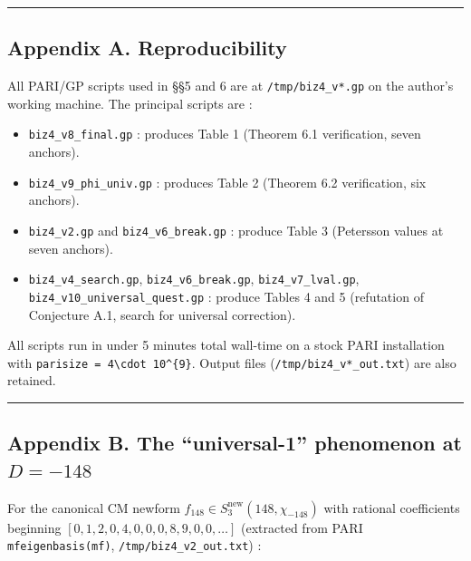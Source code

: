 \documentclass[
  11pt,
  a4paper,
]{amsart}
\providecommand{\tightlist}{\setlength{\itemsep}{0pt}\setlength{\parskip}{0pt}}
\providecommand{\tightlist}{%
  \setlength{\itemsep}{0pt}\setlength{\parskip}{0pt}}
\begin{document}
\begin{center}\rule{0.5\linewidth}{0.5pt}\end{center}

\hypertarget{appendix-a.-reproducibility}{%
\subsection{Appendix A. Reproducibility}\label{appendix-a.-reproducibility}}

All PARI/GP scripts used in §§5 and 6 are at \texttt{/tmp/biz4\_v*.gp} on the author's working machine. The principal scripts are :

\begin{itemize}
\tightlist
\item
  \texttt{biz4\_v8\_final.gp} : produces Table 1 (Theorem 6.1 verification, seven anchors).
\item
  \texttt{biz4\_v9\_phi\_univ.gp} : produces Table 2 (Theorem 6.2 verification, six anchors).
\item
  \texttt{biz4\_v2.gp} and \texttt{biz4\_v6\_break.gp} : produce Table 3 (Petersson values at seven anchors).
\item
  \texttt{biz4\_v4\_search.gp}, \texttt{biz4\_v6\_break.gp}, \texttt{biz4\_v7\_lval.gp}, \texttt{biz4\_v10\_universal\_quest.gp} : produce Tables 4 and 5 (refutation of Conjecture A.1, search for universal correction).
\end{itemize}

All scripts run in under 5 minutes total wall-time on a stock PARI installation with \texttt{parisize\ =\ 4\textbackslash{}cdot\ 10\^{}\{9\}}. Output files (\texttt{/tmp/biz4\_v*\_out.txt}) are also retained.

\begin{center}\rule{0.5\linewidth}{0.5pt}\end{center}

\hypertarget{appendix-b.-the-universal-1-phenomenon-at-d--148}{%
\subsection{\texorpdfstring{Appendix B. The ``universal-1'' phenomenon at \(D = -148\)}{Appendix B. The ``universal-1'' phenomenon at D = -148}}\label{appendix-b.-the-universal-1-phenomenon-at-d--148}}

For the canonical CM newform \(f_{148} \in S_3^{\mathrm{new}}(148, \chi_{-148})\) with rational coefficients beginning \([0, 1, 2, 0, 4, 0, 0, 0, 8, 9, 0, 0, \ldots]\) (extracted from PARI \texttt{mfeigenbasis(mf)}, \texttt{/tmp/biz4\_v2\_out.txt}) :
\end{document}
